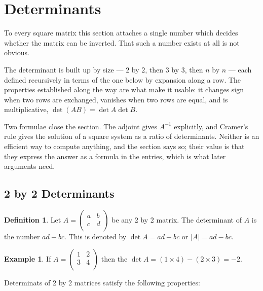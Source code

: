 \documentclass[11pt,a4paper]{article}
\theoremstyle{definition}
\newtheorem{defn}[thm]{Definition}
\newtheorem{exa}[thm]{Example}
\begin{document}
\section{Determinants}
To every square matrix this section attaches a single number which decides
whether the matrix can be inverted. That such a number exists at all is not
obvious.

The determinant is built up by size --- $2$ by $2$, then $3$ by $3$, then $n$
by $n$ --- each defined recursively in terms of the one below by expansion
along a row. The properties established along the way are what make it usable:
it changes sign when two rows are exchanged, vanishes when two rows are equal,
and is multiplicative, $\det(AB)=\det A\det B$.

Two formulae close the section. The adjoint gives $A^{-1}$ explicitly, and
Cramer's rule gives the solution of a square system as a ratio of determinants.
Neither is an efficient way to compute anything, and the section says so; their
value is that they express the answer as a formula in the entries, which is
what later arguments need.



\subsection{2 by 2 Determinants}

\begin{defn}
Let $
A=
\begin{pmatrix}
a&b\\c&d\\
\end{pmatrix}
$
be any 2 by 2 matrix. The determinant of $A$ is the number $ad-bc$. This is denoted by $\det A=ad-bc$ or $|A|=ad-bc$.
\end{defn}


\begin{exa}
If $A=
\begin{pmatrix}
1&2\\3&4\\
\end{pmatrix}
$ then the $\det A=(1\times 4)-(2\times 3)=-2$.
\end{exa}
Determinats of 2 by 2 matrices satisfy the following properties:
\end{document}
